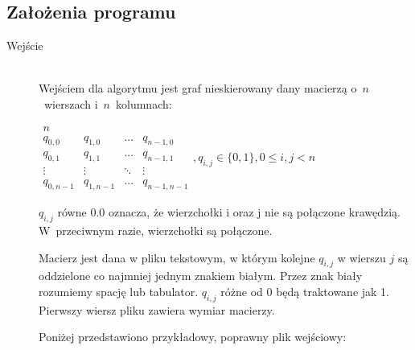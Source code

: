\documentclass[12pt, a4paper]{article}
\begin{document}
\subsection{Założenia programu}
\begin{description}
	\item[Wejście] \hfill \\
Wejściem dla algorytmu jest graf nieskierowany dany macierzą o~$n$~wierszach i~$n$~kolumnach:

\bigskip
$ 
\begin{array}{llll}
n \\
q_{0,0} & q_{1,0} & \ldots & q_{n-1,0} \\
q_{0,1} & q_{1,1} & \ldots & q_{n-1,1} \\
\vdots  & \vdots  & \ddots & \vdots  \\
q_{0,n-1} & q_{1,n-1} & \ldots & q_{n-1,n-1} 
\end{array}
, q_{i,j} \in \{0,1\}, 0 \leq i,j < n
$
\bigskip

$q_{i,j}$ równe 0.0 oznacza, że wierzchołki i oraz j nie są połączone krawędzią. W~przeciwnym razie, wierzchołki są połączone.

Macierz jest dana w pliku tekstowym, w którym kolejne $q_{i,j}$ w wierszu $j$ są
oddzielone co najmniej jednym znakiem białym. Przez znak biały rozumiemy
spację lub tabulator. $q_{i,j}$ różne od 0 będą traktowane jak 1. Pierwszy wiersz pliku zawiera wymiar macierzy.

Poniżej przedstawiono przykładowy, poprawny plik wejściowy:


\end{description}
\end{document}
